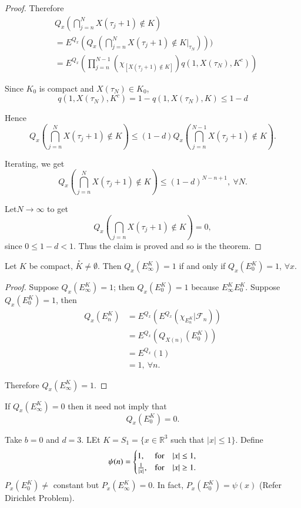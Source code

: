 \begin{proof}
Therefore
\begin{align*}
& Q_{x}\left(\bigcap^{N}_{j=n}X(\tau_{j}+1)\not\in K\right)\\
&= E^{Q_{x}}(Q_{x}(\bigcap^{N}_{j=n}X(\tau_{j}+1)\not\in
  K|_{\tau_{N}})))\\
&= E^{Q_{x}}\left(\prod^{N-1}_{j=n}(\chi_{[X(\tau_{j}+1)\not\in
      K]})q(1,X(\tau_{N}), K^{c})\right)
\end{align*}

Since $K_{0}$ is compact and $X(\tau_{N})\in K_{0}$,
$$
q(1,X(\tau_{N}),K^{c})=1-q(1,X(\tau_{N}),K)\leq 1-d
$$

Hence
$$
Q_{x}\left(\bigcap\limits^{N}_{j=n}X(\tau_{j}+1)\not\in K\right)\leq
(1-d)Q_{x}\left(\bigcap\limits^{N-1}_{j=n}X(\tau_{j}+1)\not\in
K\right).
$$

Iterating, we get
$$
Q_{x}\left(\bigcap\limits^{N}_{j=n}X(\tau_{j}+1)\not\in K\right)\leq
(1-d)^{N-n+1},\ \forall N.
$$

Let\pageoriginale $N\to \infty$ to get
$$
Q_{x}\left(\bigcap_{j=n}X(\tau_{j}+1)\not\in K\right)=0,
$$
since $0\leq 1-d<1$. Thus the claim is proved and so is the theorem.
\end{proof}

\begin{coro*}
Let $K$ be compact, $\overset{\circ}{K}\neq \emptyset$. Then
$Q_{x}(E^{K}_{\infty})=1$ if and only if $Q_{x}(E^{K}_{0})=1$,
$\forall x$.
\end{coro*}

\begin{proof}
Suppose $Q_{x}(E^{K}_{\infty})=1$; then $Q_{x}(E^{K}_{0})=1$ because
$E^{K}_{\infty}E^{K}_{0}$. Suppose $Q_{x}(E^{K}_{0})=1$, then
\begin{align*}
Q_{x}(E^{K}_{n}) &=
E^{Q_{x}}(E^{Q_{x}}(\chi_{E^{K}_{n}}|\mathscr{F}_{n}))\\
&= E^{Q_{x}}(Q_{X(n)}(E^{K}_{0}))\\
&= E^{Q_{x}}(1)\\
&= 1,\ \forall n.
\end{align*}

Therefore $Q_{x}(E^{K}_{\infty})=1$.
\end{proof}

\begin{remark*}
If $Q_{x}(E^{K}_{\infty})=0$ then it need not imply that
$$
Q_{x}(E^{K}_{0})=0.
$$
\end{remark*}

\begin{example*}
Take $b=0$ and $d=3$. LEt $K=S_{1}=\{x\in \mathbb{R}^{3}$ such that
$|x|\leq 1\}$. Define
$$
\psi(n)=
\begin{cases}
1, & \text{for}\quad |x|\leq 1,\\
\frac{1}{|x|}, & \text{for}\quad |x|\geq 1.
\end{cases}
$$
$P_{x}(E^{K}_{0})\neq$ constant but $P_{x}(E^{K}_{\infty})=0$. In
fact, $P_{x}(E^{K}_{0})=\psi(x)$ (Refer Dirichlet Problem).
\end{example*}

